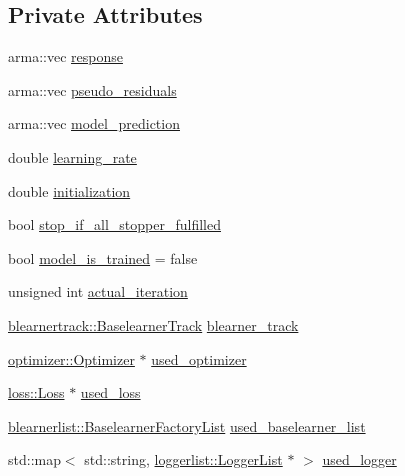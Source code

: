 \subsection*{Private Attributes}
\begin{DoxyCompactItemize}
\item 
arma\+::vec \hyperlink{classcboost_1_1_compboost_a01de924b977c9ba12a3f3be88e2586e4}{response}
\item 
arma\+::vec \hyperlink{classcboost_1_1_compboost_acb8716c9e383e15ae7d8785a591860f7}{pseudo\+\_\+residuals}
\item 
arma\+::vec \hyperlink{classcboost_1_1_compboost_a7f7c7fe26c16c175e7d402aca781e8da}{model\+\_\+prediction}
\item 
double \hyperlink{classcboost_1_1_compboost_aa6a7b77188ae60be668e87018d28835a}{learning\+\_\+rate}
\item 
double \hyperlink{classcboost_1_1_compboost_a2056c4035d5e0d8b0dcb4daedfadee16}{initialization}
\item 
bool \hyperlink{classcboost_1_1_compboost_a40c118dcaf96479cd6574138f9b2620f}{stop\+\_\+if\+\_\+all\+\_\+stopper\+\_\+fulfilled}
\item 
bool \hyperlink{classcboost_1_1_compboost_af1da66c1def3edd484f5d30b36e64eeb}{model\+\_\+is\+\_\+trained} = false
\item 
unsigned int \hyperlink{classcboost_1_1_compboost_a3db81c285c1cd238d0fb65dfc6c00439}{actual\+\_\+iteration}
\item 
\hyperlink{classblearnertrack_1_1_baselearner_track}{blearnertrack\+::\+Baselearner\+Track} \hyperlink{classcboost_1_1_compboost_af9c2787818f591941f74af0059ca7dc9}{blearner\+\_\+track}
\item 
\hyperlink{classoptimizer_1_1_optimizer}{optimizer\+::\+Optimizer} $\ast$ \hyperlink{classcboost_1_1_compboost_a6c0311a05cf6128b4c76fabbc432b807}{used\+\_\+optimizer}
\item 
\hyperlink{classloss_1_1_loss}{loss\+::\+Loss} $\ast$ \hyperlink{classcboost_1_1_compboost_a9c776faf5e9b9e99b5241f2a650d5242}{used\+\_\+loss}
\item 
\hyperlink{classblearnerlist_1_1_baselearner_factory_list}{blearnerlist\+::\+Baselearner\+Factory\+List} \hyperlink{classcboost_1_1_compboost_ac4c690473dc39e10e84ae9d9219b1fa1}{used\+\_\+baselearner\+\_\+list}
\item 
std\+::map$<$ std\+::string, \hyperlink{classloggerlist_1_1_logger_list}{loggerlist\+::\+Logger\+List} $\ast$ $>$ \hyperlink{classcboost_1_1_compboost_a05590928bf741eecb135f32da339ceaa}{used\+\_\+logger}
\end{DoxyCompactItemize}


